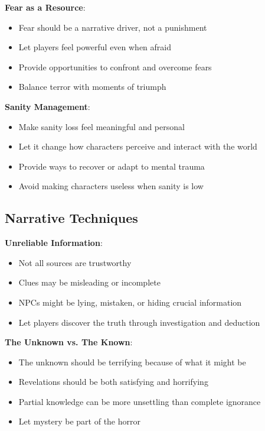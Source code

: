 \documentclass[11pt]{article}
\begin{document}
\begin{mdframed}[backgroundcolor=sanitybg]
\textbf{Fear as a Resource}:
\begin{itemize}[leftmargin=*]
\item Fear should be a narrative driver, not a punishment
\item Let players feel powerful even when afraid
\item Provide opportunities to confront and overcome fears
\item Balance terror with moments of triumph
\end{itemize}

\textbf{Sanity Management}:
\begin{itemize}[leftmargin=*]
\item Make sanity loss feel meaningful and personal
\item Let it change how characters perceive and interact with the world
\item Provide ways to recover or adapt to mental trauma
\item Avoid making characters useless when sanity is low
\end{itemize}
\end{mdframed}

\subsection*{Narrative Techniques}

\begin{mdframed}[backgroundcolor=horrorbg]
\textbf{Unreliable Information}:
\begin{itemize}[leftmargin=*]
\item Not all sources are trustworthy
\item Clues may be misleading or incomplete
\item NPCs might be lying, mistaken, or hiding crucial information
\item Let players discover the truth through investigation and deduction
\end{itemize}

\textbf{The Unknown vs. The Known}:
\begin{itemize}[leftmargin=*]
\item The unknown should be terrifying because of what it might be
\item Revelations should be both satisfying and horrifying
\item Partial knowledge can be more unsettling than complete ignorance
\item Let mystery be part of the horror
\end{itemize}
\end{mdframed}
\end{document}
